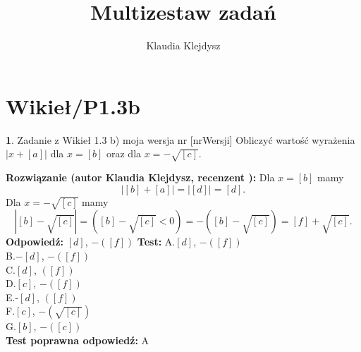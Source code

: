 \documentclass[12pt, a4paper]{article}
\title{Multizestaw zadań}
\author{Klaudia Klejdysz}
\date{}
\theoremstyle{definition} %
\newtheorem{zad}{}
\newcommand{\kategoria}[1]{\section{#1}} %
\newcommand{\zadStart}[1]{\begin{zad}#1\newline} %
\newcommand{\zadStop}{\end{zad}}   %
\newcommand{\rozwStart}[2]{\noindent \textbf{Rozwiązanie (autor Klaudia Klejdysz, recenzent #2): }\newline} %
\newcommand{\rozwStop}{\newline}                                            %
\newcommand{\odpStart}{\noindent \textbf{Odpowiedź:}\newline}    %
\newcommand{\odpStop}{\newline}                                             %
\newcommand{\testStart}{\noindent \textbf{Test:}\newline} %
\newcommand{\testStop}{\newline} %
\newcommand{\kluczStart}{\noindent \textbf{Test poprawna odpowiedź:}\newline} %
\newcommand{\kluczStop}{\newline} %
\begin{document}
\maketitle


\kategoria{Wikieł/P1.3b}
\zadStart{Zadanie z Wikieł 1.3 b) moja wersja nr [nrWersji]}
Obliczyć wartość wyrażenia $|x+[a]|$ dla $x=[b]$ oraz dla $x=-\sqrt{[c]}$.
\zadStop
\rozwStart{Klaudia Klejdysz}{}
Dla $x=[b]$ mamy $$|[b]+[a]|=|[d]|=[d].$$
Dla $x=-\sqrt{[c]}$ mamy $$|[b]-\sqrt{[c]}|=( [b]-\sqrt{[c]}<0)=-([b]-\sqrt{[c]})=[f]+\sqrt{[c]}.$$
\rozwStop
\odpStart
$[d]$,
$-([f])$
\odpStop
\testStart
A.$[d]$, $-([f])$\\
B.$-[d]$, $-([f])$\\
C.$[d]$, $([f])$\\
D.$[c]$, $-([f])$\\
E.-$[d]$, $([f])$\\
F.$[c]$, $-(\sqrt{[c]})$\\
G.$[b]$, $-([c])$\\
\testStop
\kluczStart
A
\kluczStop
\end{document}
